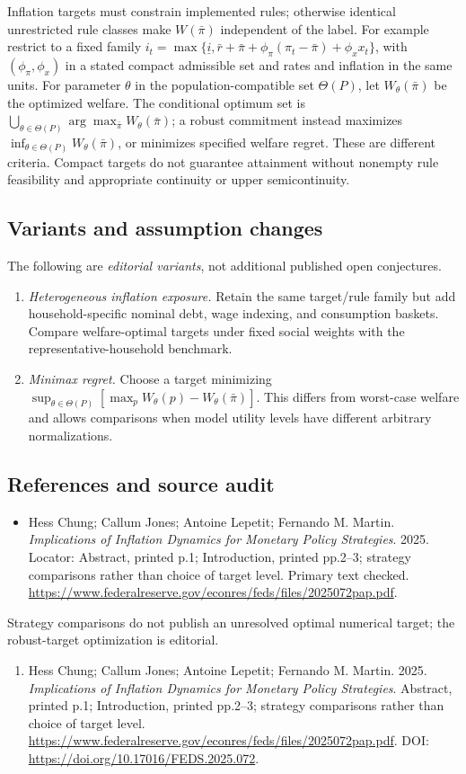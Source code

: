 \documentclass[11pt,a4paper]{article}
\begin{document}
Inflation targets must constrain implemented rules; otherwise identical unrestricted rule classes make \(W(\bar\pi)\) independent of the label. For example restrict to a fixed family \(i_t=\max\{\underline i,\bar r+\bar\pi+\phi_\pi(\pi_t-\bar\pi)+\phi_xx_t\}\), with \((\phi_\pi,\phi_x)\) in a stated compact admissible set and rates and inflation in the same units. For parameter \(\theta\) in the population-compatible set \(\Theta(P)\), let \(W_\theta(\bar\pi)\) be the optimized welfare. The conditional optimum set is \(\bigcup_{\theta\in\Theta(P)}\arg\max_{\bar\pi}W_\theta(\bar\pi)\); a robust commitment instead maximizes \(\inf_{\theta\in\Theta(P)}W_\theta(\bar\pi)\), or minimizes specified welfare regret. These are different criteria. Compact targets do not guarantee attainment without nonempty rule feasibility and appropriate continuity or upper semicontinuity.
\subsection*{Variants and assumption changes}
The following are \emph{editorial variants}, not additional published open conjectures.
\begin{enumerate}
\item \emph{Heterogeneous inflation exposure.} Retain the same target/rule family but add household-specific nominal debt, wage indexing, and consumption baskets. Compare welfare-optimal targets under fixed social weights with the representative-household benchmark.
\item \emph{Minimax regret.} Choose a target minimizing \(\sup_{\theta\in\Theta(P)}[\max_{p}W_\theta(p)-W_\theta(\bar\pi)]\). This differs from worst-case welfare and allows comparisons when model utility levels have different arbitrary normalizations.
\end{enumerate}
\subsection*{References and source audit}
\begin{itemize}
\item Hess Chung; Callum Jones; Antoine Lepetit; Fernando M. Martin. \emph{Implications of Inflation Dynamics for Monetary Policy Strategies}. 2025. Locator: Abstract, printed p.1; Introduction, printed pp.2--3; strategy comparisons rather than choice of target level. Primary text checked. \url{https://www.federalreserve.gov/econres/feds/files/2025072pap.pdf}.
\end{itemize}
Strategy comparisons do not publish an unresolved optimal numerical target; the robust-target optimization is editorial.
\begin{enumerate}\raggedright
\item\hypertarget{definitions:source:30007528:1}{} Hess Chung; Callum Jones; Antoine Lepetit; Fernando M. Martin. 2025. \emph{Implications of Inflation Dynamics for Monetary Policy Strategies}. Abstract, printed p.1; Introduction, printed pp.2--3; strategy comparisons rather than choice of target level.
\url{https://www.federalreserve.gov/econres/feds/files/2025072pap.pdf}.
DOI: \url{https://doi.org/10.17016/FEDS.2025.072}.
\end{enumerate}
\end{document}
